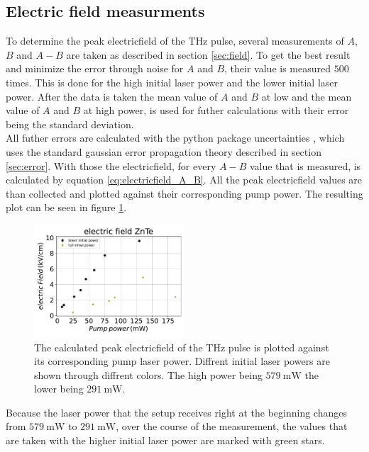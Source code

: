 \subsection{Electric field measurments}
\label{sec:znte_electricfield}
\FloatBarrier
To determine the peak electricfield of the $\si{\tera\hertz}$ pulse, several measurements of $A$, $B$ and $A-B$ are taken as described in section \ref{sec:field}.
To get the best result and minimize the error through noise for $A$ and $B$, their value is measured $500$ times.
This is done for the high initial laser power and the lower initial laser power.
After the data is taken the mean value of $A$ and $B$ at low and the mean value of $A$ and $B$ at high power, is used for futher calculations with their error being the standard deviation.
\\
All futher errors are calculated with the python package uncertainties \cite{uncertainties}, which uses the standard gaussian error propagation theory described in section \ref{sec:error}.
With those the electricfield, for every $A-B$ value that is measured, is calculated by equation \ref{eq:electricfield_A_B}.
All the peak electricfield values are than collected and plotted against their corresponding pump power.
The resulting plot can be seen in figure \ref{fig:znte_electricfield}.
\\
\begin{figure}
    \centering
    \includegraphics[width=0.5\textwidth]{Plots/eltric_field_ZnTe.pdf}
    \caption{The calculated peak electricfield of the $\si{\tera\hertz}$ pulse is plotted against its corresponding pump laser power.
    Diffrent initial laser powers are shown through diffrent colors. The high power being $\SI{579}{\milli\W}$ the lower being $\SI{291}{\milli\W}$.}
    \label{fig:znte_electricfield}
\end{figure}
Because the laser power that the setup receives right at the beginning changes from $\SI{579}{\milli\W}$ to $\SI{291}{\milli\W}$, over the course of the measurement, the values that are taken with the higher initial laser power are marked with green stars.
